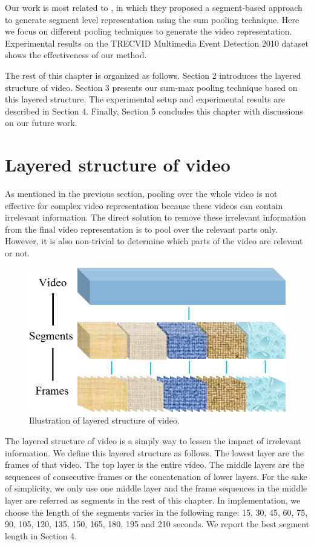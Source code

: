 Our work is most related to \cite{DBLP:journals/vlsisp/PhanNLTLDS14}, in which they proposed a segment-based approach to generate segment level representation using the sum pooling technique. Here we focus on different pooling techniques to generate the video representation. Experimental results on the TRECVID Multimedia Event Detection 2010 dataset shows the effectiveness of our method.

The rest of this chapter is organized as follows. Section 2 introduces the layered structure of video. Section 3 presents our sum-max pooling technique based on this layered structure. The experimental setup and experimental results are described in Section 4. Finally, Section 5 concludes this chapter with discussions on our future work.

\section{Layered structure of video} 
\label{sec:format}
As mentioned in the previous section, pooling over the whole video is not effective for complex video representation because these videos can contain irrelevant information. The direct solution to remove these irrelevant information from the final video representation is to pool over the relevant parts only. However, it is also non-trivial to determine which parts of the video are relevant or not. 
\begin{figure}[!htb]
	\centering
	\includegraphics[width=1\textwidth]{layered.png}
	\caption{Illustration of layered structure of video.}
	\label{f_sum_max}
\end{figure}

The layered structure of video is a simply way to lessen the impact of irrelevant information. We define this layered structure as follows. The lowest layer are the frames of that video. The top layer is the entire video. The middle layers are the sequences of consecutive frames or the concatenation of lower layers. For the sake of simplicity, we only use one middle layer and the frame sequences in the middle layer are referred as segments in the rest of this chapter. In implementation, we choose the length of the segments varies in the following range: 15, 30, 45, 60, 75, 90, 105, 120, 135, 150, 165, 180, 195 and 210 seconds. We report the best segment length in Section 4.

